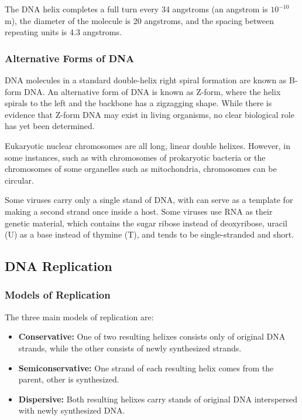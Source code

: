 \documentclass[12pt,titlepage]{article}
\begin{document}
      The DNA helix completes a full turn every 34 angstroms (an angstrom is $10^{-10}$m), the diameter of the molecule is 20 angstroms, and the spacing between repeating
      units is 4.3 angstroms.

      \subsubsection{Alternative Forms of DNA}
        DNA molecules in a standard double-helix right spiral formation are known as B-form DNA. An alternative form of DNA is known as Z-form, where the helix spirals
        to the left and the backbone has a zigzagging shape. While there is evidence that Z-form DNA may exist in living organisms, no clear biological role has yet
        been determined.

        Eukaryotic nuclear chromosomes are all long, linear double helixes. However, in some instances, such as with chromosomes of prokaryotic bacteria or the chromosomes
        of some organelles such as mitochondria, chromosomes can be circular.

        Some viruses carry only a single stand of DNA, with can serve as a template for making a second strand once inside a host. Some viruses use RNA as their genetic
        material, which contains the sugar ribose instead of deoxyribose, uracil (U) as a base instead of thymine (T), and tends to be single-stranded and short.

    \subsection{DNA Replication}
      \subsubsection{Models of Replication}
        The three main models of replication are:
        \begin{itemize}
          \item \textbf{Conservative:} One of two resulting helixes consists only of original DNA strands, while the other consists of newly synthesized strands.
          \item \textbf{Semiconservative:} One strand of each resulting helix comes from the parent, other is synthesized.
          \item \textbf{Dispersive:} Both resulting helixes carry stands of original DNA interspersed with newly synthesized DNA.
        \end{itemize}
\end{document}
